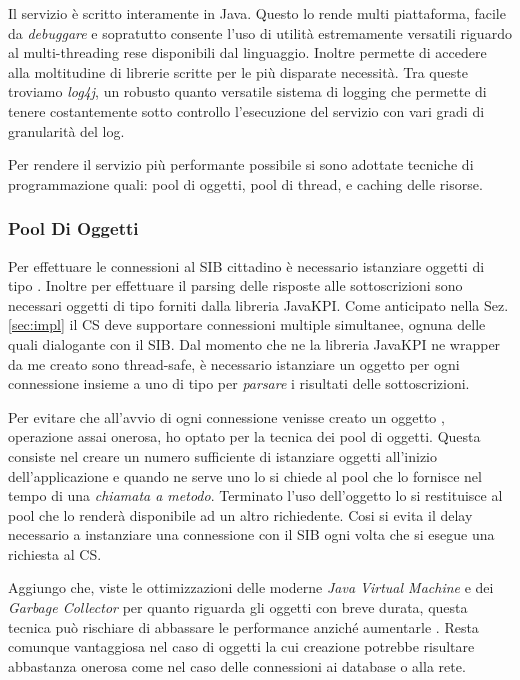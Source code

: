 Il servizio è scritto interamente in Java. Questo lo rende multi piattaforma, facile da \emph{debuggare} e sopratutto consente l'uso di utilità estremamente versatili riguardo al multi-threading rese disponibili dal linguaggio. Inoltre permette di accedere alla moltitudine di librerie scritte per le più disparate necessità. Tra queste troviamo \emph{log4j}, un robusto quanto versatile sistema di logging che permette di tenere costantemente sotto controllo l'esecuzione del servizio con vari gradi di granularità del log.

Per rendere il servizio più performante possibile si sono adottate tecniche di programmazione quali: pool di oggetti, pool di thread, e caching delle risorse.

\subsubsection{Pool Di Oggetti}

Per effettuare le connessioni al SIB cittadino è necessario istanziare oggetti di tipo . Inoltre per effettuare il parsing delle risposte alle sottoscrizioni sono necessari oggetti di tipo  forniti dalla libreria JavaKPI. Come anticipato nella Sez. \ref{sec:impl} il CS deve supportare connessioni multiple simultanee, ognuna delle quali dialogante con il SIB. Dal momento che ne la libreria JavaKPI ne wrapper da me creato sono thread-safe, è necessario istanziare un oggetto  per ogni connessione insieme a uno di tipo  per \emph{parsare} i risultati delle sottoscrizioni.

Per evitare che all'avvio di ogni connessione venisse creato un oggetto , operazione assai onerosa, ho optato per la tecnica dei pool di oggetti. Questa consiste nel creare un numero sufficiente di istanziare oggetti all'inizio dell'applicazione e quando ne serve uno lo si chiede al pool che lo fornisce nel tempo di una \emph{chiamata a metodo}. Terminato l'uso dell'oggetto lo si restituisce al pool che lo renderà disponibile ad un altro richiedente.
Cosi si evita il delay necessario a instanziare una connessione con il SIB ogni volta che si esegue una richiesta al CS.

Aggiungo che, viste le ottimizzazioni delle moderne \emph{Java Virtual Machine} e dei \emph{Garbage Collector} per quanto riguarda gli oggetti con breve durata, questa tecnica può rischiare di abbassare le performance anziché aumentarle \cite{torok2011}. Resta comunque vantaggiosa nel caso di oggetti la cui creazione potrebbe risultare abbastanza onerosa come nel caso delle connessioni ai database o alla rete.

